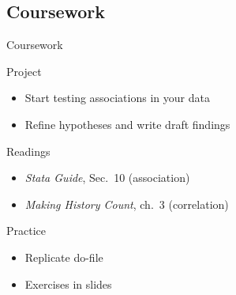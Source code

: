 \documentclass[t]{beamer}
\begin{document}

	\subsection{Coursework}

	\begin{frame}[c]{Coursework}

		\begin{alertblock}{Project}
			\begin{itemize}
				\item Start testing associations in your data
				\item Refine hypotheses and write draft findings
			\end{itemize}
		\end{alertblock}
		
		\begin{block}{Readings}
			\begin{itemize}
				\item \emph{Stata Guide}, Sec.~10 (association)
				\item \emph{Making History Count}, ch.~3 (correlation)
			\end{itemize}
		\end{block}
			
		\begin{exampleblock}{Practice}
			\begin{itemize}
				\item Replicate do-file
				\item Exercises in slides
			\end{itemize}
		\end{exampleblock}
			
	\end{frame}
	
\end{document}
